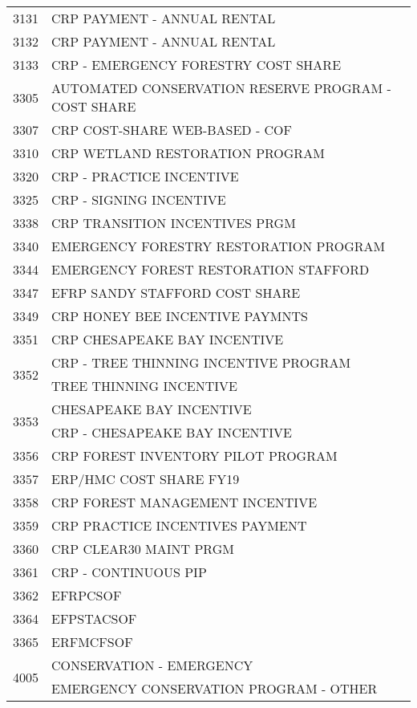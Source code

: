 \begin{longtable}{ll}
\cline{1-2}
3131 & CRP PAYMENT - ANNUAL RENTAL \\
\cline{1-2}
3132 & CRP PAYMENT - ANNUAL RENTAL \\
\cline{1-2}
3133 & CRP - EMERGENCY FORESTRY COST SHARE \\
\cline{1-2}
3305 & AUTOMATED CONSERVATION RESERVE PROGRAM - COST SHARE \\
\cline{1-2}
3307 & CRP COST-SHARE WEB-BASED - COF \\
\cline{1-2}
3310 & CRP WETLAND RESTORATION PROGRAM \\
\cline{1-2}
3320 & CRP - PRACTICE INCENTIVE \\
\cline{1-2}
3325 & CRP - SIGNING INCENTIVE \\
\cline{1-2}
3338 & CRP TRANSITION INCENTIVES PRGM \\
\cline{1-2}
3340 & EMERGENCY FORESTRY RESTORATION PROGRAM \\
\cline{1-2}
3344 & EMERGENCY FOREST RESTORATION STAFFORD \\
\cline{1-2}
3347 & EFRP SANDY STAFFORD COST SHARE \\
\cline{1-2}
3349 & CRP HONEY BEE INCENTIVE PAYMNTS \\
\cline{1-2}
3351 & CRP CHESAPEAKE BAY INCENTIVE \\
\cline{1-2}
\multirow[t]{2}{*}{3352} & CRP - TREE THINNING INCENTIVE PROGRAM \\
 & TREE THINNING INCENTIVE \\
\cline{1-2}
\multirow[t]{2}{*}{3353} & CHESAPEAKE BAY INCENTIVE \\
 & CRP - CHESAPEAKE BAY INCENTIVE \\
\cline{1-2}
3356 & CRP FOREST INVENTORY PILOT PROGRAM \\
\cline{1-2}
3357 & ERP/HMC COST SHARE FY19 \\
\cline{1-2}
3358 & CRP FOREST MANAGEMENT INCENTIVE \\
\cline{1-2}
3359 & CRP PRACTICE INCENTIVES PAYMENT \\
\cline{1-2}
3360 & CRP CLEAR30 MAINT PRGM \\
\cline{1-2}
3361 & CRP - CONTINUOUS PIP \\
\cline{1-2}
3362 & EFRPCSOF \\
\cline{1-2}
3364 & EFPSTACSOF \\
\cline{1-2}
3365 & ERFMCFSOF \\
\cline{1-2}
\multirow[t]{2}{*}{4005} & CONSERVATION - EMERGENCY \\
 & EMERGENCY CONSERVATION PROGRAM - OTHER \\

\end{longtable}
